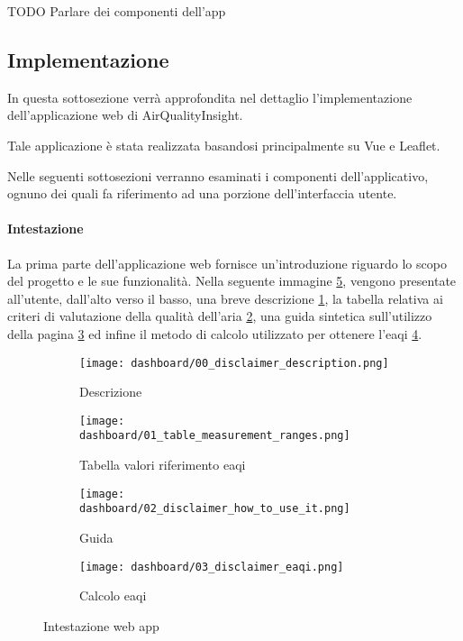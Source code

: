 TODO Parlare dei componenti dell'app

\subsection{Implementazione}

In questa sottosezione verrà approfondita nel dettaglio l'implementazione dell'applicazione web di AirQualityInsight.

Tale applicazione è stata realizzata basandosi principalmente su Vue e Leaflet.

Nelle seguenti sottosezioni verranno esaminati i componenti dell'applicativo, ognuno dei quali fa riferimento
ad una porzione dell'interfaccia utente.

\paragraph{Intestazione}

La prima parte dell'applicazione web fornisce un'introduzione riguardo lo scopo del progetto e le sue funzionalità.
Nella seguente immagine \ref{fig:app-heading}, vengono presentate all'utente, dall'alto verso il basso,
una breve descrizione \ref{fig:app-description},
la tabella relativa ai criteri di valutazione della qualità dell'aria \ref{fig:app-eaqi-table},
una guida sintetica sull'utilizzo della pagina \ref{fig:app-guide} ed infine
il metodo di calcolo utilizzato per ottenere l'\acrfull{eaqi} \ref{fig:app-eaqi-calculation}.

\begin{figure}[H]
  \centering

  \begin{subfigure}{\textwidth}
    \centering
    \texttt{[image: dashboard/00\_disclaimer\_description.png]}
    \caption{Descrizione}
    \label{fig:app-description}
  \end{subfigure}

  \hfill
  \begin{subfigure}{\textwidth}
    \centering
    \texttt{[image: dashboard/01\_table\_measurement\_ranges.png]}
    \caption{Tabella valori riferimento \acrfull{eaqi}}
    \label{fig:app-eaqi-table}
  \end{subfigure}


  \hfill
  \begin{subfigure}{\textwidth}
    \centering
    \texttt{[image: dashboard/02\_disclaimer\_how\_to\_use\_it.png]}
    \caption{Guida}
    \label{fig:app-guide}
  \end{subfigure}

  \hfill
  \begin{subfigure}{\textwidth}
    \centering
    \texttt{[image: dashboard/03\_disclaimer\_eaqi.png]}
    \caption{Calcolo \acrfull{eaqi}}
    \label{fig:app-eaqi-calculation}
  \end{subfigure}

  \caption{Intestazione web app}
  \label{fig:app-heading}
\end{figure}

